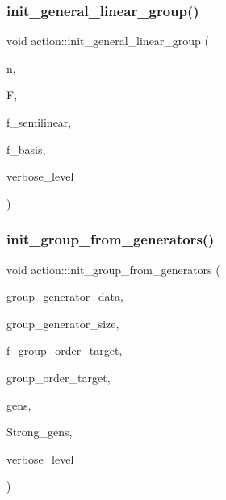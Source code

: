 \subsubsection{\texorpdfstring{init\+\_\+general\+\_\+linear\+\_\+group()}{init\_general\_linear\_group()}}
{\footnotesize\ttfamily void action\+::init\+\_\+general\+\_\+linear\+\_\+group (\begin{DoxyParamCaption}\item[{\mbox{\hyperlink{galois_8h_a09fddde158a3a20bd2dcadb609de11dc}{I\+NT}}}]{n,  }\item[{\mbox{\hyperlink{classfinite__field}{finite\+\_\+field}} $\ast$}]{F,  }\item[{\mbox{\hyperlink{galois_8h_a09fddde158a3a20bd2dcadb609de11dc}{I\+NT}}}]{f\+\_\+semilinear,  }\item[{\mbox{\hyperlink{galois_8h_a09fddde158a3a20bd2dcadb609de11dc}{I\+NT}}}]{f\+\_\+basis,  }\item[{\mbox{\hyperlink{galois_8h_a09fddde158a3a20bd2dcadb609de11dc}{I\+NT}}}]{verbose\+\_\+level }\end{DoxyParamCaption})}

\mbox{\label{classaction_a3f7f2e7e9b9345f050a1181682f52210}} 
\subsubsection{\texorpdfstring{init\+\_\+group\+\_\+from\+\_\+generators()}{init\_group\_from\_generators()}}
{\footnotesize\ttfamily void action\+::init\+\_\+group\+\_\+from\+\_\+generators (\begin{DoxyParamCaption}\item[{\mbox{\hyperlink{galois_8h_a09fddde158a3a20bd2dcadb609de11dc}{I\+NT}} $\ast$}]{group\+\_\+generator\+\_\+data,  }\item[{\mbox{\hyperlink{galois_8h_a09fddde158a3a20bd2dcadb609de11dc}{I\+NT}}}]{group\+\_\+generator\+\_\+size,  }\item[{\mbox{\hyperlink{galois_8h_a09fddde158a3a20bd2dcadb609de11dc}{I\+NT}}}]{f\+\_\+group\+\_\+order\+\_\+target,  }\item[{const \mbox{\hyperlink{galois_8h_ab6cc7b4aeb6ea31aba2b3fbfc83ff5e6}{B\+Y\+TE}} $\ast$}]{group\+\_\+order\+\_\+target,  }\item[{\mbox{\hyperlink{classvector__ge}{vector\+\_\+ge}} $\ast$}]{gens,  }\item[{\mbox{\hyperlink{classstrong__generators}{strong\+\_\+generators}} $\ast$\&}]{Strong\+\_\+gens,  }\item[{\mbox{\hyperlink{galois_8h_a09fddde158a3a20bd2dcadb609de11dc}{I\+NT}}}]{verbose\+\_\+level }\end{DoxyParamCaption})}

